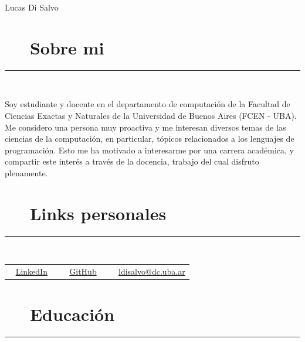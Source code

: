 \documentclass{article}
\begin{document}
\pagestyle{empty}

\par{\centering
		{\huge Lucas Di Salvo}
	\bigskip\par}

\section*{\faUser ~~ Sobre mi}
\hrule

\
\newline
\

Soy estudiante y docente en el departamento de computación de la Facultad de Ciencias Exactas y Naturales de la Universidad de Buenos Aires (FCEN - UBA). Me considero una persona muy proactiva y me interesan diversos temas de las ciencias de la computación, en particular, tópicos relacionados a los lenguajes de programación. Esto me ha motivado a interesarme por una carrera académica, y compartir este interés a través de la docencia, trabajo del cual disfruto plenamente.

\section*{\faAt ~~ Links personales}
\hrule

\
\newline
\

\begin{tabular}{l | l | l}
      \faLinkedin ~ \href{https://www.linkedin.com/in/lucas-di-salvo-6578b915a}{LinkedIn} \
     & \faGithub ~ \href{https://github.com/lucasDS-0}{GitHub}  \
     & \faEnvelope ~ \href{mailto:ldisalvo@dc.uba.ar}{ldisalvo@dc.uba.ar}
\end{tabular}

\section*{\faBook ~~ Educación}
\hrule

\
\newline
\
\end{document}
